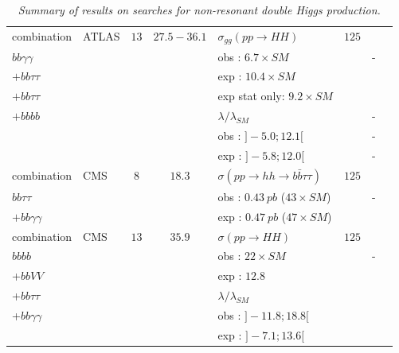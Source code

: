 \begin{table}[h!]
\begin{center}
\begin{tabular}{|l|l|c|c|l|l|c|c|}
\hline
combination                &ATLAS            &$13$        &$27.5-36.1$    &$\sigma_{gg}(pp\rightarrow HH)$    &$125$    &    &\cite{ATLAS:2018otd}\\
$bb \gamma\gamma$            &            &        &        &obs : $6.7\times SM$            &    &-    &\\
$+bb \tau\tau$                &            &        &        &exp : $10.4\times SM$            &    &    &\\
$+bb \tau\tau$                &            &        &        &exp stat only: $9.2\times SM$            &    &    &\\
$+bb bb$                &            &        &        &$\lambda/\lambda_{SM}$                &     &-    &\\
                    &            &        &        &obs : $]-5.0 ; 12.1[$                &     &-    &\\
                    &            &        &        &exp : $]-5.8 ; 12.0[$                &     &-    &\\


\hline


combination                &CMS            &$8$        &$18.3$        &$\sigma(pp\rightarrow hh\rightarrow b\bar{b}\tau\tau)$  &$125$    &    &\cite{Sirunyan:2017tqo}\\
$bb\tau\tau$                &            &        &        &obs : $0.43\ pb$ ($43\times SM$)                            &    &-    &\\
$+bb\gamma\gamma$            &            &        &        &exp : $0.47\ pb$ ($47\times SM$)                            &    &    &\\
\hline
combination                &CMS            &$13$        &$35.9$        &$\sigma(pp\rightarrow HH)$              &$125$    &    &\cite{CMS:2018obr}\\
$bbbb$                    &            &        &        &obs : $22\times SM$                &    &-    &\\
+$bbVV$                    &            &        &        &exp : $12.8$                    &    &    &\\
+$bb\tau\tau$                &            &        &        &$\lambda/\lambda_{SM}$                &    &    &\\
+$bb\gamma\gamma$            &            &        &        &obs : $]-11.8 ; 18.8[$                &    &    &\\
                    &            &        &        &exp : $]-7.1 ; 13.6[$                &    &    &\\
\hline
\end{tabular}
\normalsize
\end{center}
\vspace{-0.5cm}
\caption{\normalsize\it Summary of results on searches for non-resonant double Higgs production.}
\label{Summary_analyses_searches_non_resonant_HH}
\end{table}

